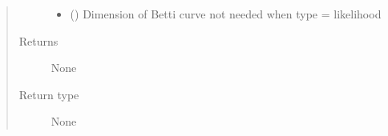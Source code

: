 \documentclass[letterpaper,10pt,english]{sphinxmanual}
\begin{document}
\begin{fulllineitems}
\begin{quote}
\begin{description}
\begin{itemize}
\item {} 
\sphinxAtStartPar
{} () \textendash{} Dimension of Betti curve not needed when type = likelihood

\end{itemize}

\item[{Returns}] \leavevmode
\sphinxAtStartPar
None

\item[{Return type}] \leavevmode
\sphinxAtStartPar
None

\end{description}\end{quote}

\end{fulllineitems}

\end{document}
